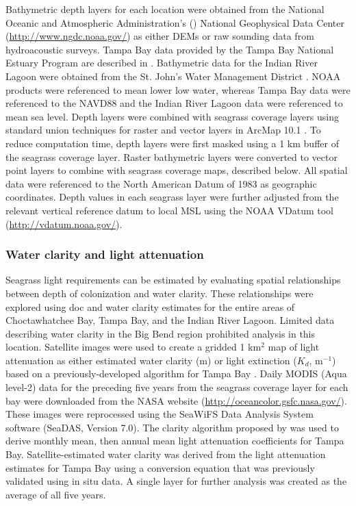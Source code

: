 \documentclass[letterpaper,12pt,oneside]{article}\usepackage[]{graphicx}\usepackage[]{color}
\begin{document}
Bathymetric depth layers for each location were obtained from the National Oceanic and Atmospheric Administration's () National Geophysical Data Center (\url{http://www.ngdc.noaa.gov/}) as either \acp{DEM} or raw sounding data from hydroacoustic surveys.  Tampa Bay data provided by the Tampa Bay National Estuary Program are described in \citet{Tyler07}. Bathymetric data for the Indian River Lagoon were obtained from the St. John's Water Management District \citep{CPE97}.  \ac{NOAA} products were referenced to mean lower low water, whereas Tampa Bay data were referenced to the \ac{NAVD88} and the Indian River Lagoon data were referenced to mean sea level.  Depth layers were combined with seagrass coverage layers using standard union techniques for raster and vector layers in ArcMap 10.1 \citep{ESRI12}.  To reduce computation time, depth layers were first masked using a 1 km buffer of the seagrass coverage layer.  Raster bathymetric layers were converted to vector point layers to combine with seagrass coverage maps, described below.  All spatial data were referenced to the North American Datum of 1983 as geographic coordinates.  Depth values in each seagrass layer were further adjusted from the relevant vertical reference datum to local \ac{MSL} using the \ac{NOAA} VDatum tool (\url{http://vdatum.noaa.gov/}).

\subsubsection{Water clarity and light attenuation}

Seagrass light requirements can be estimated by evaluating spatial relationships between depth of colonization and water clarity.  These relationships were explored using \ac{doc} and water clarity estimates for the entire areas of Choctawhatchee Bay, Tampa Bay, and the Indian River Lagoon. Limited data describing water clarity in the Big Bend region prohibited analysis in this location.  Satellite images were used to create a gridded 1 km$^2$ map of light attenuation as either estimated water clarity (m) or light extinction ($K_d$, m$^{-1}$) based on a previously-developed algorithm for Tampa Bay \citep{Chen07}.  Daily MODIS (Aqua level-2) data for the preceding five years from the seagrass coverage layer for each bay were downloaded from the NASA website (\url{http://oceancolor.gsfc.nasa.gov/}). These images were reprocessed using the SeaWiFS Data Analysis System software (SeaDAS, Version 7.0). The clarity algorithm proposed by \citet{Chen07} was used to derive monthly mean, then annual mean light attenuation coefficients for Tampa Bay.  Satellite-estimated water clarity was derived from the light attenuation estimates for Tampa Bay using a conversion equation that was previously validated using in situ data.  A single layer for further analysis was created as the average of all five years.
\end{document}

